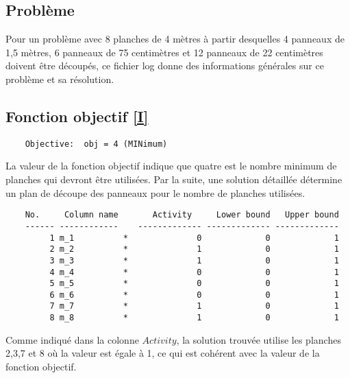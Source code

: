 \documentclass{article}[A4]
\begin{document}
\subsection{Problème}
Pour un problème avec 8 planches de 4 mètres à partir desquelles 4 
panneaux de 1,5 mètres, 6 panneaux de 75 centimètres et 12 panneaux de 22 
centimètres doivent être découpés, ce fichier log donne des informations
générales sur ce problème et sa résolution.
\subsection{Fonction objectif \ref{I}}
\begin{verbatim}
	Objective:  obj = 4 (MINimum)
\end{verbatim}
La valeur de la fonction objectif indique que quatre est le nombre 
minimum de planches qui devront être utilisées. Par la suite, une 
solution détaillée détermine un plan de découpe des panneaux pour le 
nombre de planches utilisées.
\begin{verbatim}
	No.     Column name       Activity     Lower bound   Upper bound
	------ ------------    ------------- ------------- -------------
	     1 m_1          *              0             0             1 
	     2 m_2          *              1             0             1 
	     3 m_3          *              1             0             1 
	     4 m_4          *              0             0             1 
	     5 m_5          *              0             0             1 
	     6 m_6          *              0             0             1 
	     7 m_7          *              1             0             1 
	     8 m_8          *              1             0             1 

\end{verbatim}
Comme indiqué dans la colonne $Activity$, la solution trouvée utilise 
les planches 2,3,7 et 8 où la valeur est égale à 1, ce qui est cohérent 
avec la valeur de la fonction objectif.
\end{document}
